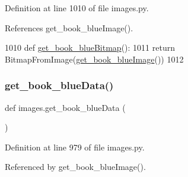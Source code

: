 Definition at line 1010 of file images.\+py.



References get\+\_\+book\+\_\+blue\+Image().


\begin{DoxyCode}
1010 \textcolor{keyword}{def }\hyperlink{namespaceimages_a5e3e22e08960039b29ff55566be4691c}{get\_book\_blueBitmap}():
1011     \textcolor{keywordflow}{return} BitmapFromImage(\hyperlink{namespaceimages_aec387bcd60dd97d588c6c8e1d8fc636a}{get\_book\_blueImage}())
1012 
\end{DoxyCode}
\mbox{\label{namespaceimages_a9bec51464c6a49d85543696895516451}} 
\subsubsection{\texorpdfstring{get\+\_\+book\+\_\+blue\+Data()}{get\_book\_blueData()}}
{\footnotesize\ttfamily def images.\+get\+\_\+book\+\_\+blue\+Data (\begin{DoxyParamCaption}{ }\end{DoxyParamCaption})}



Definition at line 979 of file images.\+py.



Referenced by get\+\_\+book\+\_\+blue\+Image().


